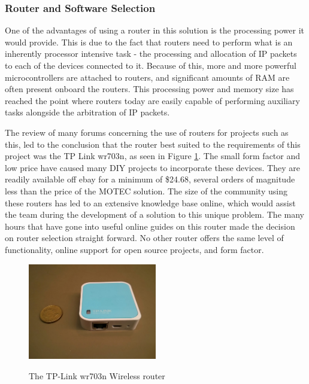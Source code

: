 \subsubsection{Router and Software Selection}
One of the advantages of using a router in this solution is the processing power it would provide. This is due to the fact that routers need to perform what is an inherently processor intensive task - the processing and allocation of IP packets to each of the devices connected to it\cite{doyle2005routing}. Because of this, more and more powerful microcontrollers are attached to routers, and significant amounts of RAM are often present onboard the routers. This processing power and memory size has reached the point where routers today are easily capable of performing auxiliary tasks alongside the arbitration of IP packets. 

The review of many forums concerning the use of routers for projects such as this\cite{openwrt_buyersguide}\cite{ddwrt_supporteddevices}, led to the conclusion that the router best suited to the requirements of this project was the TP Link wr703n, as seen in Figure \ref{TEL_router}. The small form factor and low price have caused many DIY projects to incorporate these devices\cite{wr703n_instructables}\cite{wr703n_hackaday}. They are readily available off ebay for a minimum of \$24.68\cite{wr703n_price}, several orders of magnitude less than the price of the MOTEC solution. The size of the community using these routers has led to an extensive knowledge base online, which would assist the team during the development of a solution to this unique problem. The many hours that have gone into useful online guides on this router made the decision on router selection straight forward. No other router offers the same level of functionality, online support for open source projects, and form factor.\\

\begin{figure}[h!]
  \caption{The TP-Link wr703n Wireless router}
  \centering
    \includegraphics[width=0.5\textwidth]{Images/Telemetry/TEL_router.jpg}
    \label{TEL_router}
\end{figure}


